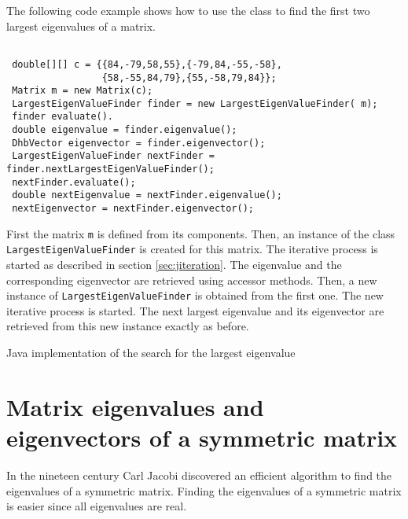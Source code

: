 \documentclass[twoside]{book}
\begin{document}
The following code example shows how to use the class to find the
first two largest eigenvalues of a matrix.
\begin{codeExample}
\begin{verbatim}

 double[][] c = {{84,-79,58,55},{-79,84,-55,-58},
                 {58,-55,84,79},{55,-58,79,84}};
 Matrix m = new Matrix(c);
 LargestEigenValueFinder finder = new LargestEigenValueFinder( m);
 finder evaluate().
 double eigenvalue = finder.eigenvalue();
 DhbVector eigenvector = finder.eigenvector();
 LargestEigenValueFinder nextFinder = finder.nextLargestEigenValueFinder();
 nextFinder.evaluate();
 double nextEigenvalue = nextFinder.eigenvalue();
 nextEigenvector = nextFinder.eigenvector();
\end{verbatim}
\end{codeExample}
First the matrix {\tt m} is defined from its components. Then, an
instance of the class {\tt LargestEigenValueFinder} is created for
this matrix. The iterative process is started as described in
section \ref{sec:jiteration}. The eigenvalue and the corresponding
eigenvector are retrieved using accessor methods. Then, a new
instance of {\tt LargestEigenValueFinder} is obtained from the
first one. The new iterative process is started. The next largest
eigenvalue and its eigenvector are retrieved from this new
instance exactly as before.

\begin{listing} Java implementation of the search for the largest eigenvalue
\label{lj:eigenlarge}

\end{listing}

\section{Matrix eigenvalues and eigenvectors of a symmetric matrix}
\label{sec:eigensym}
In the nineteen century Carl Jacobi discovered an efficient
algorithm to find the eigenvalues of a symmetric matrix. Finding
the eigenvalues of a symmetric matrix is easier since all
eigenvalues are real.
\end{document}
